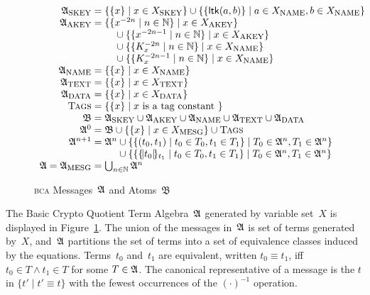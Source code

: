 \documentclass[12pt]{article}
\theoremstyle{definition}
\newcommand{\scap}[1]{\ensuremath{\mathop{\relax
                    \smash{\mbox{\sc#1}}}\!\mathop{\vphantom{#1}}\nolimits}}
\newcommand{\bca}{\textsc{bca}}
\newcommand{\alga}{\alg{A}}
\newcommand{\base}{\ensuremath{\mathfrak B}}
\begin{document}
\begin{figure}
$$\begin{array}{r@{{}={}}l}
\alga_{\scap{skey}}&\{\{x\}\mid x \in X_{\scap{skey}}\} \cup \{\{\cn{ltk}(a,b)\}\mid a \in X_{\scap{name}}, b \in X_{\scap{name}}\}\\
\alga_{\scap{akey}}&\begin{array}[t]{@{}l}
\{\{x^{-2n}\mid n\in\nat\}\mid x\in X_{\scap{akey}}\}\\
\quad{}\cup\{\{x^{-2n-1}\mid n\in\nat\}\mid x\in X_{\scap{akey}}\}\\
\quad{}\cup\{\{K_x^{-2n}\mid n\in\nat\}\mid x\in X_{\scap{name}}\}\\
\quad{}\cup\{\{K_x^{-2n-1}\mid n\in\nat\}\mid x\in X_{\scap{name}}\}\\
\end{array}\\
\alga_{\scap{name}}&\{\{x\}\mid x \in X_{\scap{name}}\}\\
\alga_{\scap{text}}&\{\{x\}\mid x \in X_{\scap{text}}\}\\
\alga_{\scap{data}}&\{\{x\}\mid x \in X_{\scap{data}}\}\\
\scap{Tags}&\{\{x\}\mid x \hbox{ is a tag constant }\}\\
\base&\alga_{\scap{skey}} \cup \alga_{\scap{akey}} \cup \alga_{\scap{name}} \cup \alga_{\scap{text}} \cup \alga_{\scap{data}}\\
\alga^0&\base\cup \{\{x\}\mid x\in X_{\scap{mesg}}\} \cup \scap{Tags}\\
\alga^{n+1}&\alga^n
\begin{array}[t]{@{}l}
{}\cup\{\{(t_0,t_1)\mid t_0\in T_0, t_1\in T_1\}\mid
 T_0\in\alga^n,T_1\in\alga^n\}\\
{}\cup\{\{\enc{t_0}{t_1}\mid t_0\in T_0, t_1\in T_1\}\mid
 T_0\in\alga^n,T_1\in\alga^n\}
\end{array}\\
\alga = \alga_{\scap{mesg}}&\bigcup_{n\in\nat}\alga^n
\end{array}$$
\caption{{\bca} Messages~$\alga$ and Atoms~$\base$}\label{fig:algebra}
\end{figure}

The Basic Crypto Quotient Term Algebra~$\alga$ generated by variable
set~$X$ is displayed in Figure~\ref{fig:algebra}.  The union of the
messages in~$\alga$ is set of terms generated by~$X$, and~$\alga$
partitions the set of terms into a set of equivalence classes induced
by the equations.  Terms~$t_0$ and~$t_1$ are equivalent, written
$t_0\equiv t_1$, iff $t_0\in T\land t_1\in T$ for some $T\in\alga$.
The canonical representative of a message is the $t$ in $\{t'\mid
t'\equiv t\}$ with the fewest occurrences of the $(\cdot)^{-1}$
operation.
\end{document}

